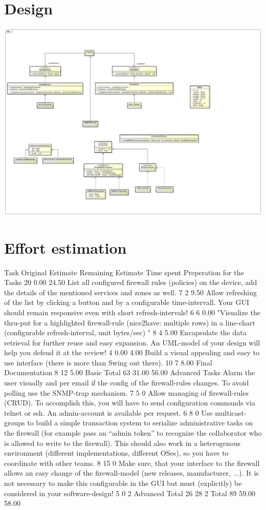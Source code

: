 \documentclass[11pt, a4paper]{article}
\begin{document}
\section{Design}
\includegraphics[width=\textwidth]{images/uml}
 
\section{Effort estimation}

Task	Original Estimate 	Remaining Estimate	Time spent
Preperation for the Tasks	20	0.00	24.50
List all configured firewall rules (policies) on the device, add the details of the mentioned services and zones as well.	7	2	9.50
Allow refreshing of the list by clicking a button and by a configurable time-intervall. Your GUI should remain responsive even with short refresh-intervals!	6	6	0.00
"Visualize the thru-put for a highlighted firewall-rule (nice2have: multiple rows) in a line-chart (configurable refresh-interval, unit bytes/sec)
"	8	4	5.00
Encapsulate the data retrieval for further reuse and easy expansion. An UML-model of your design will help you defend it at the review!	4	0.00	4.00
Build a visual appealing and easy to use interface (there is more than Swing out there).	10	7	8.00
Final Documentation 	8	12	5.00
Basic Total	63	31.00	56.00
Advanced Tasks			
Alarm the user visually and per email if the config of the firewall-rules changes. To avoid polling use the SNMP-trap mechanism.	7	5	0
Allow managing of firewall-rules (CRUD). To accomplish this, you will have to send configuration commands via telnet or ssh. An admin-account is available per request.	6	8	0
Use multicast-groups to build a simple transaction system to serialize administrative tasks on the firewall (for example pass an “admin token” to recognize the collaborator who is allowed to write to the firewall). This should also work in a heterogenous environment (different implementations, different OSes), so you have to coordinate with other teams.	8	15	0
Make sure, that your interface to the firewall allows an easy change of the firewall-model (new releases, manufacturer, ...). It is not necessary to make this configurable in the GUI but must (explicitly) be considered in your software-design!	5	0	2
Advanced Total	26	28	2
Total	89	59.00	58.00
\end{document}

